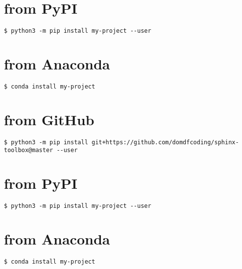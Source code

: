 \documentclass[letterpaper,10pt,english]{sphinxmanual}
\begin{document}
\chapter{from PyPI}
\label{\detokenize{installation:installation-14-from_PyPI}}\label{\detokenize{installation:installation-14}}
\begin{Verbatim}[commandchars=\\\{\}]
$ python3 -m pip install my-project --user
\end{Verbatim}


\chapter{from Anaconda}
\label{\detokenize{installation:installation-14-from_Anaconda}}
\begin{Verbatim}[commandchars=\\\{\}]
$ conda install my-project
\end{Verbatim}


\chapter{from GitHub}
\label{\detokenize{installation:installation-14-from_GitHub}}
\begin{Verbatim}[commandchars=\\\{\}]
$ python3 -m pip install git+https://github.com/domdfcoding/sphinx-toolbox@master --user
\end{Verbatim}


\chapter{from PyPI}
\label{\detokenize{installation:installation-15-from_PyPI}}\label{\detokenize{installation:installation-15}}
\begin{Verbatim}[commandchars=\\\{\}]
$ python3 -m pip install my-project --user
\end{Verbatim}


\chapter{from Anaconda}
\label{\detokenize{installation:installation-15-from_Anaconda}}
\begin{Verbatim}[commandchars=\\\{\}]
$ conda install my-project
\end{Verbatim}
\end{document}
